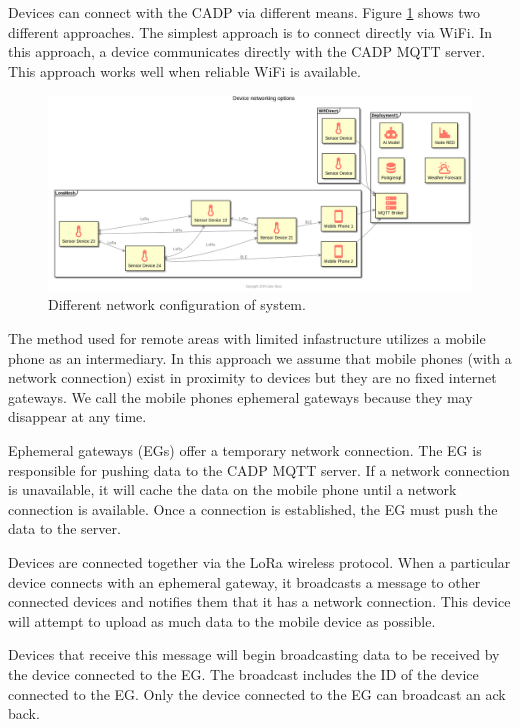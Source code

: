 \documentclass[
]{book}
\begin{document}
Devices can connect with the CADP via different means.
Figure \ref{fig:device-networking} shows two different approaches.
The simplest approach is to connect directly via WiFi.
In this approach, a device communicates directly with the CADP MQTT server.
This approach works well when reliable WiFi is available.

\begin{figure}

{\centering \includegraphics[width=19.99in]{images/device_networking} 

}

\caption{Different network configuration of system.}\label{fig:device-networking}
\end{figure}

The method used for remote areas with limited infastructure utilizes
a mobile phone as an intermediary.
In this approach we assume that mobile phones (with a network connection)
exist in proximity to devices but they are no fixed internet gateways.
We call the mobile phones ephemeral gateways because they may disappear
at any time.

Ephemeral gateways (EGs) offer a temporary network connection.
The EG is responsible for pushing data to the CADP MQTT server.
If a network connection is unavailable,
it will cache the data on the mobile phone until a network connection is
available.
Once a connection is established, the EG must push the data to the server.

Devices are connected together via the LoRa wireless protocol.
When a particular device connects with an ephemeral gateway,
it broadcasts a message to other connected devices and notifies them
that it has a network connection.
This device will attempt to upload as much data to the mobile device as
possible.

Devices that receive this message will begin broadcasting data to be received
by the device connected to the EG.
The broadcast includes the ID of the device connected to the EG.
Only the device connected to the EG can broadcast an ack back.
\end{document}
